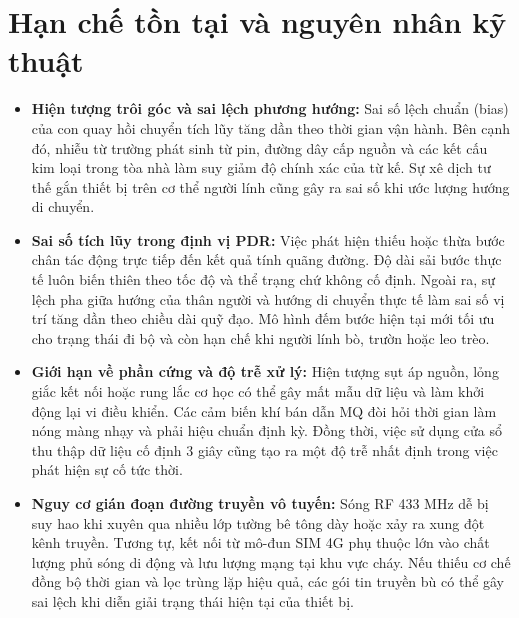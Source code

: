 \section{Hạn chế tồn tại và nguyên nhân kỹ thuật}\label{sec:limitations}
\begin{itemize}
\item \textbf{Hiện tượng trôi góc và sai lệch phương hướng:} Sai số lệch chuẩn (bias) của con quay hồi chuyển tích lũy tăng dần theo thời gian vận hành. Bên cạnh đó, nhiễu từ trường phát sinh từ pin, đường dây cấp nguồn và các kết cấu kim loại trong tòa nhà làm suy giảm độ chính xác của từ kế. Sự xê dịch tư thế gắn thiết bị trên cơ thể người lính cũng gây ra sai số khi ước lượng hướng di chuyển.
\item \textbf{Sai số tích lũy trong định vị PDR:} Việc phát hiện thiếu hoặc thừa bước chân tác động trực tiếp đến kết quả tính quãng đường. Độ dài sải bước thực tế luôn biến thiên theo tốc độ và thể trạng chứ không cố định. Ngoài ra, sự lệch pha giữa hướng của thân người và hướng di chuyển thực tế làm sai số vị trí tăng dần theo chiều dài quỹ đạo. Mô hình đếm bước hiện tại mới tối ưu cho trạng thái đi bộ và còn hạn chế khi người lính bò, trườn hoặc leo trèo.
\item \textbf{Giới hạn về phần cứng và độ trễ xử lý:} Hiện tượng sụt áp nguồn, lỏng giắc kết nối hoặc rung lắc cơ học có thể gây mất mẫu dữ liệu và làm khởi động lại vi điều khiển. Các cảm biến khí bán dẫn MQ đòi hỏi thời gian làm nóng màng nhạy và phải hiệu chuẩn định kỳ. Đồng thời, việc sử dụng cửa sổ thu thập dữ liệu cố định 3 giây cũng tạo ra một độ trễ nhất định trong việc phát hiện sự cố tức thời.
\item \textbf{Nguy cơ gián đoạn đường truyền vô tuyến:} Sóng RF 433 MHz dễ bị suy hao khi xuyên qua nhiều lớp tường bê tông dày hoặc xảy ra xung đột kênh truyền. Tương tự, kết nối từ mô-đun SIM 4G phụ thuộc lớn vào chất lượng phủ sóng di động và lưu lượng mạng tại khu vực cháy. Nếu thiếu cơ chế đồng bộ thời gian và lọc trùng lặp hiệu quả, các gói tin truyền bù có thể gây sai lệch khi diễn giải trạng thái hiện tại của thiết bị.
\end{itemize}

